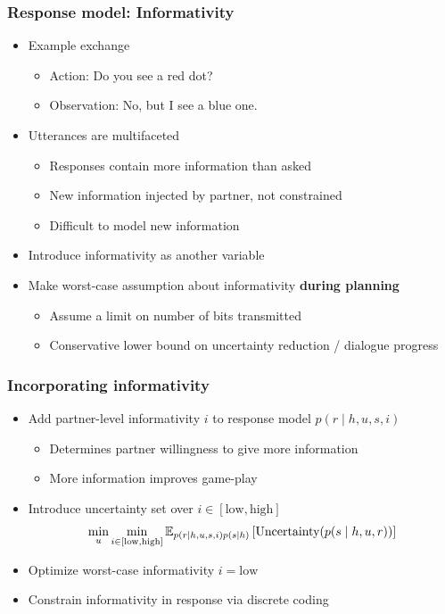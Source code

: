 \documentclass{beamer}
\begin{document}
\begin{frame}
\frametitle{Response model: Informativity}
\begin{itemize}
\item Example exchange
    \begin{itemize}
    \item Action: Do you see a red dot?
    \item Observation: No, but I see a blue one.
    \end{itemize}
\item Utterances are multifaceted
    \begin{itemize}
    \item Responses contain more information than asked
    \item New information injected by partner, not constrained
    \item Difficult to model new information
    \end{itemize}
\item Introduce informativity as another variable
\item Make worst-case assumption about informativity \textbf{during planning}
    \begin{itemize}
    \item Assume a limit on number of bits transmitted
    \item Conservative lower bound on uncertainty reduction / dialogue progress
    \end{itemize}
\end{itemize}
\end{frame}

\begin{frame}
\frametitle{Incorporating informativity}
\begin{itemize}
\item Add partner-level informativity $i$ to response model
$p(r \mid h, u, s, i)$
    \begin{itemize}
    \item Determines partner willingness to give more information
    \item More information improves game-play
    \end{itemize}
\item Introduce uncertainty set over $i \in [\text{low}, \text{high}]$
$$\min_{u}\min_{i\in[\text{low},\text{high}]}
    \mathbb{E}_{p(r \mid h, u, s, i)p(s \mid h)}\left[\text{Uncertainty}(p(s \mid h, u, r))\right]$$
\item Optimize worst-case informativity $i = \text{low}$
\item Constrain informativity in response via discrete coding
\end{itemize}
\end{frame}
\end{document}
